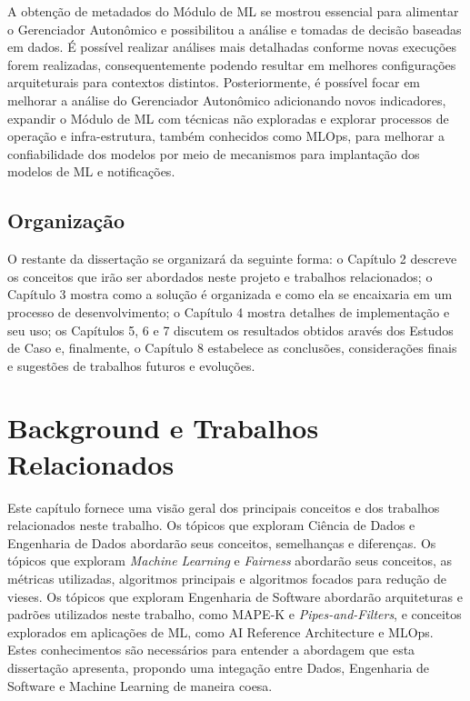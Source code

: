 \documentclass[Portugues,Final]{ic-tese-v3}
\begin{document}
A obtenção de metadados do Módulo de ML se mostrou essencial para alimentar o Gerenciador Autonômico e possibilitou a análise e tomadas de decisão baseadas em dados. É possível realizar análises mais detalhadas conforme novas execuções forem realizadas, consequentemente podendo resultar em melhores configurações arquiteturais para contextos distintos. Posteriormente, é possível focar em melhorar a análise do Gerenciador Autonômico adicionando novos indicadores, expandir o Módulo de ML com técnicas não exploradas e explorar processos de operação e infra-estrutura, também conhecidos como MLOps, para melhorar a confiabilidade dos modelos por meio de mecanismos para implantação dos modelos de ML e notificações.

\section{Organização}

O restante da dissertação se organizará da seguinte forma: o Capítulo 2 descreve os conceitos que irão ser abordados neste projeto e trabalhos relacionados; o Capítulo 3 mostra como a solução é organizada e como ela se encaixaria em um processo de desenvolvimento; o Capítulo 4 mostra detalhes de implementação e seu uso; os Capítulos 5, 6 e 7 discutem os resultados obtidos aravés dos Estudos de Caso e, finalmente, o Capítulo 8 estabelece as conclusões, considerações finais e sugestões de trabalhos futuros e evoluções.

\chapter{Background e Trabalhos Relacionados}

Este capítulo fornece uma visão geral dos principais conceitos e dos trabalhos relacionados neste trabalho. Os tópicos que exploram Ciência de Dados e Engenharia de Dados abordarão seus conceitos, semelhanças e diferenças. Os tópicos que exploram \textit{Machine Learning} e \textit{Fairness} abordarão seus conceitos, as métricas utilizadas, algoritmos principais e algoritmos focados para redução de vieses. Os tópicos que exploram Engenharia de Software abordarão arquiteturas e padrões utilizados neste trabalho, como MAPE-K e \textit{Pipes-and-Filters}, e conceitos explorados em aplicações de ML, como AI Reference Architecture e MLOps. Estes conhecimentos são necessários para entender a abordagem que esta dissertação apresenta, propondo uma integação entre Dados, Engenharia de Software e Machine Learning de maneira coesa.
\end{document}
